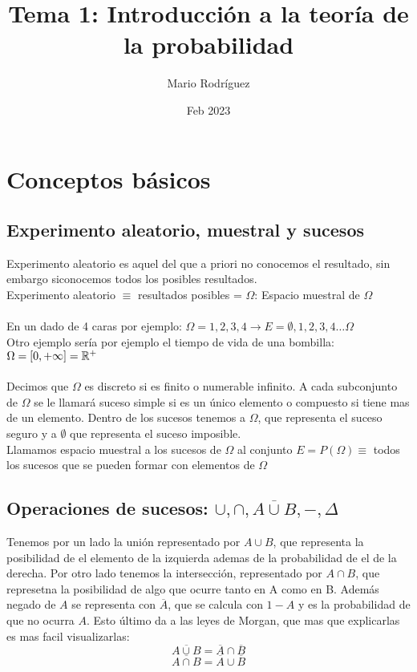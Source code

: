 \documentclass{article}
\title{Tema 1: Introducción a la teoría de la probabilidad}
\author{Mario Rodríguez}
\date{Feb 2023}
\begin{document}
\maketitle
\section{Conceptos básicos}
\subsection{Experimento aleatorio, muestral y sucesos}
Experimento aleatorio es aquel del que a priori no conocemos el resultado, sin embargo siconocemos todos los posibles resultados.\\

Experimento aleatorio $\equiv$ {resultados posibles} = $\Omega$: Espacio muestral de $\Omega$
\\
\\En un dado de 4 caras por ejemplo: $\Omega = {1,2,3,4} \rightarrow E={{\emptyset},{1},{2},{3},{4}\ldots{\Omega}}$
\\Otro ejemplo sería por ejemplo el tiempo de vida de una bombilla: $\Omega = [0,+\infty]=\mathbb{R}\textsuperscript{+}$
\\
\\Decimos que $\Omega$ es discreto si es finito o numerable infinito. A cada subconjunto de $\Omega$ se le llamará suceso simple si es un único elemento o compuesto si tiene mas de un elemento. Dentro de los sucesos tenemos a $\Omega$, que representa el suceso seguro y a $\emptyset$ que representa el suceso imposible.
\\
Llamamos espacio muestral a los sucesos de $\Omega$ al conjunto $E=P(\Omega) \equiv $ todos los sucesos que se pueden formar con elementos de $\Omega$

\subsection*{Operaciones de sucesos: $\cup ,\cap, \overline{A\cup B},-, \Delta $}
Tenemos por un lado la unión representado por $A\cup B$, que representa la posibilidad de el elemento de la izquierda ademas de la probabilidad de el de la derecha. 
Por otro lado tenemos la intersección, representado por $A\cap B$, que represetna la posibilidad de algo que ocurre tanto en A como en B. 
Además negado de $A$ se representa con $\overline{A}$, que se calcula con $1-A$ y es la probabilidad de que no ocurra $A$.
Esto último da a las leyes de Morgan, que mas que explicarlas es mas facil visualizarlas:
\[\overline{A \cup B}=\overline{A} \cap \overline{B}\]
\[\overline{A \cap B}=\overline{A} \cup \overline{B}\]
\end{document}

